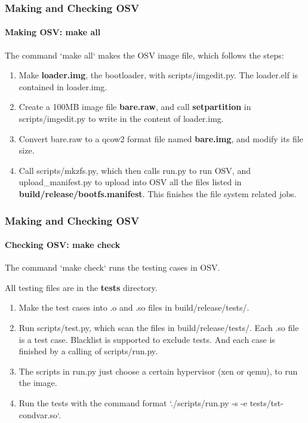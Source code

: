 \documentclass[10pt]{beamer}
\begin{document}
\begin{frame}
	\frametitle{Making and Checking OSV}
	\framesubtitle{Making OSV: make all}
	
	The command `make all` makes the OSV image file, which follows the steps:	
	
	\begin{enumerate}
		\item Make \textbf{loader.img}, the bootloader, with scripts/imgedit.py. The loader.elf is contained in loader.img.
		\item Create a 100MB image file \textbf{bare.raw}, and call \textbf{setpartition} in scripts/imgedit.py to write in the content of loader.img.
		\item Convert bare.raw to a qcow2 format file named \textbf{bare.img}, and modify its file size. 
		\item Call scripts/mkzfs.py, which then calls run.py to run OSV, and upload\_manifest.py to upload into OSV all the files listed in \textbf{build/release/bootfs.manifest}. This finishes the file system related jobs.
	\end{enumerate}
\end{frame}


\begin{frame}
	\frametitle{Making and Checking OSV}
	\framesubtitle{Checking OSV: make check}
	
	The command `make check` runs the testing cases in OSV.
	
	All testing files are in the \textbf{tests} directory.
	
	\begin{enumerate}
		\item Make the test cases into .o and .so files in build/release/tests/.
		\item Run scripts/test.py, which scan the files in build/release/tests/. Each .so file is a test case. Blacklist is supported to exclude tests. And each case is finished by a calling of scripts/run.py.
		\item The scripts in run.py just choose a certain hypervisor (xen or qemu), to run the image.
		\item Run the tests with the command format `./scripts/run.py -s -e tests/tst-condvar.so`.				
	\end{enumerate}
\end{frame}
\end{document}
